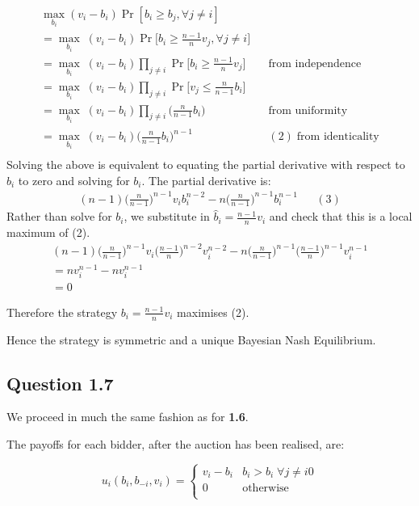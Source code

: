 \documentclass[11pt,a4paper]{article}
\begin{document}
\begin{align*}
\max_{b_i} (v_i-b_i) \Pr[b_i \geq b_j, \forall j \neq i] \\
= \max_{b_i} \;(v_i-b_i) \Pr\Big[b_i \geq \frac{n-1}{n}v_j, \forall j \neq i\Big] \\
= \max_{b_i} \;(v_i-b_i) \prod_{j \neq i} \Pr\Big[b_i \geq \frac{n-1}{n} v_j\Big] && \text{from independence}\\
= \max_{b_i} \;(v_i-b_i) \prod_{j \neq i} \Pr\Big[v_j \leq \frac{n}{n-1}b_i\Big] \\
= \max_{b_i} \;(v_i-b_i) \prod_{j \neq i} \Big(\frac{n}{n-1}b_i\Big) && \text{from uniformity}  \\
= \max_{b_i} \;(v_i-b_i) \Big(\frac{n}{n-1}b_i\Big)^{n-1} && (2) \; \text{from identicality}  \\
\end{align*}
Solving the above is equivalent to equating the partial derivative with respect to $b_i$ to zero and solving for $b_i$.
The partial derivative is:
\begin{align*}
(n-1)\Big(\frac{n}{n-1}\Big)^{n-1}v_i b_i^{n-2} - n\Big(\frac{n}{n-1}\Big)^{n-1}b_i^{n-1} && (3)
\end{align*}
Rather than solve for $b_i$, we substitute in $\hat{b}_i = \frac{n-1}{n}v_i$ and check that this is a local maximum of (2).
\begin{align*}
(n-1)\Big(\frac{n}{n-1}\Big)^{n-1}v_i\Big(\frac{n-1}{n}\Big)^{n-2}v_i^{n-2} - n\Big(\frac{n}{n-1}\Big)^{n-1}\Big(\frac{n-1}{n}\Big)^{n-1}v_i^{n-1} \\
= nv_i^{n-1} - nv_i^{n-1} \\
= 0 
\end{align*}

Therefore the strategy $b_i = \frac{n-1}{n}v_i$ maximises (2).

Hence the strategy is symmetric and a unique Bayesian Nash Equilibrium.

\subsection*{Question 1.7}

We proceed in much the same fashion as for \textbf{1.6}.

The payoffs for each bidder, after the auction has been realised, are:

$$u_i(b_i,b_{-i}, v_i) =  \begin{cases} 
      v_i-b_i & b_i>b_i \; \forall j \neq i 0 \\
      0 & \text{otherwise} \\
   \end{cases}
$$
\end{document}
